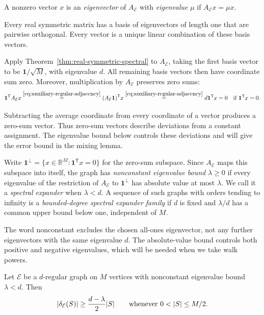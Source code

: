 A nonzero vector $x$ is an \emph{eigenvector} of $A_{\mathcal E}$
with \emph{eigenvalue} $\mu$ if $A_{\mathcal E}x=\mu x$.

\begin{theorem}
\label{thm:real-symmetric-spectral}
Every real symmetric matrix has a basis of eigenvectors of length
one that are pairwise orthogonal. Every vector is a unique linear
combination of these basis vectors.
\end{theorem}

Apply Theorem~\ref{thm:real-symmetric-spectral} to $A_{\mathcal E}$,
taking the first basis vector to be $\mathbf1/\sqrt M$, with eigenvalue $d$.
All remaining basis vectors then have coordinate sum zero.
Moreover, multiplication by $A_{\mathcal E}$ preserves zero sums:
\[
 \mathbf1^{\mathsf T}A_{\mathcal E}x
 \overset{\eqref{eq:auxiliary-regular-adjacency}}{=}
 (A_{\mathcal E}\mathbf1)^{\mathsf T}x
 \overset{\eqref{eq:auxiliary-regular-adjacency}}{=}
 d\mathbf1^{\mathsf T}x=0
 \quad\text{if }\mathbf1^{\mathsf T}x=0.
\]

Subtracting the average coordinate from every coordinate of a
vector produces a zero-sum vector. Thus zero-sum vectors describe
deviations from a constant assignment. The eigenvalue bound below
controls these deviations and will give the error bound in the
mixing lemma.

\begin{definition}
Write $\mathbf1^\perp=\{x\in\mathbb R^M:
\mathbf1^{\mathsf T}x=0\}$ for the zero-sum subspace. Since
$A_{\mathcal E}$ maps this subspace into itself, the graph has
\emph{nonconstant eigenvalue bound} $\lambda\ge0$ if every eigenvalue
of the restriction of $A_{\mathcal E}$ to $\mathbf1^\perp$ has
absolute value at most $\lambda$.
We call it a \emph{spectral expander} when $\lambda<d$.
A sequence of such graphs with orders tending to infinity is a
\emph{bounded-degree spectral expander family} if $d$ is fixed and
$\lambda/d$ has a common upper bound below one, independent of $M$.
\end{definition}

The word nonconstant excludes the chosen all-ones eigenvector,
not any further eigenvectors with the same eigenvalue $d$.
The absolute-value bound controls both positive and negative
eigenvalues, which will be needed when we take walk powers.
\begin{lemma}
\label{lem:spectral-edge-expansion}
Let $\mathcal E$ be a $d$-regular graph on $M$ vertices with
nonconstant eigenvalue bound $\lambda<d$. Then
\[
 |\cut_{\mathcal E}(S)|\geq\frac{d-\lambda}{2}|S|
 \qquad\text{whenever }0<|S|\leq M/2.
\]
\end{lemma}

